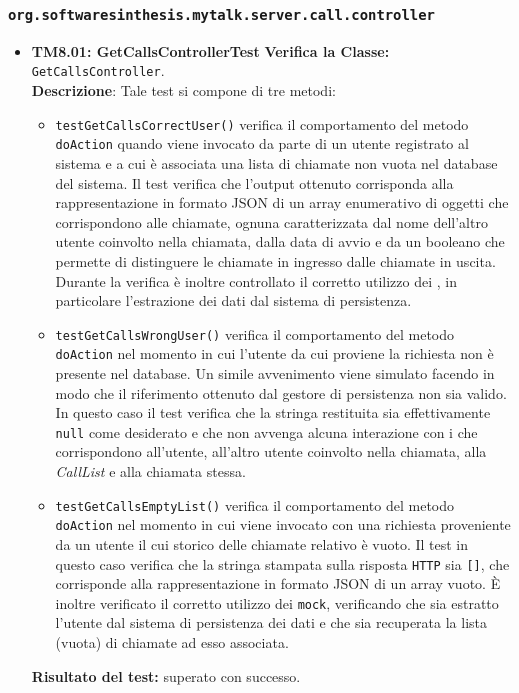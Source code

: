 \subsubsection{\texttt{org.softwaresinthesis.mytalk.server.call.controller}}
\begin{itemize}

\item \textbf{TM8.01: GetCallsControllerTest} 
\textbf{Verifica la Classe:} \texttt{GetCallsController}.\\
\textbf{Descrizione}: %
Tale test si compone di tre metodi:
\begin{itemize}
\item \texttt{testGetCallsCorrectUser()} verifica il comportamento del metodo \texttt{doAction} quando viene invocato da parte di un utente registrato al sistema e a cui è associata una lista di chiamate non vuota nel database del sistema. Il test verifica che l'output ottenuto corrisponda alla rappresentazione in formato JSON di un array enumerativo di oggetti che corrispondono alle chiamate, ognuna caratterizzata dal nome dell'altro utente coinvolto nella chiamata, dalla data di avvio e da un  booleano che permette di distinguere le chiamate in ingresso dalle chiamate in uscita. Durante la verifica è inoltre controllato il corretto utilizzo dei , in particolare l'estrazione dei dati dal sistema di persistenza.

\item \texttt{testGetCallsWrongUser()} verifica il comportamento del metodo \texttt{doAction} nel momento in cui l'utente da cui proviene la richiesta non è presente nel database. Un simile avvenimento viene simulato facendo in modo che il riferimento ottenuto dal gestore di persistenza non sia valido. In questo caso il test verifica che la stringa restituita sia effettivamente \texttt{null} come desiderato e che non avvenga alcuna interazione con i  che corrispondono all'utente, all'altro utente coinvolto nella chiamata, alla \textit{CallList} e alla chiamata stessa.

\item \texttt{testGetCallsEmptyList()} verifica il comportamento del metodo \texttt{doAction} nel momento in cui viene invocato con una richiesta proveniente da un utente il cui storico delle chiamate relativo è vuoto. Il test in questo caso verifica che la stringa stampata sulla risposta \texttt{HTTP} sia \texttt{[]}, che corrisponde alla rappresentazione in formato JSON di un array vuoto. È inoltre verificato il corretto utilizzo dei \texttt{mock}, verificando che sia estratto l'utente dal sistema di persistenza dei dati e che sia recuperata la lista (vuota) di chiamate ad esso associata.

\end{itemize}
\textbf{Risultato del test:} superato con successo.


\end{itemize}


